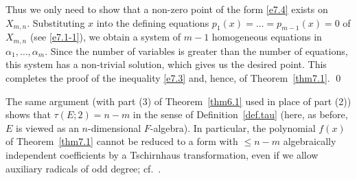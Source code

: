 Thus we only need to show that a non-zero point of the form \eqref{e7.4}
exists on $X_{m, n}$.  Substituting $x$ into the defining equations
$p_1(x) = \ldots = p_{m-1}(x) = 0$ of $X_{m, n}$ (see \eqref{e7.1-1}),
we obtain 
a system of $m-1$ homogeneous equations in $\alpha_1, \ldots, \alpha_m$.
Since the number of variables is greater than the number of equations,
this system has a non-trivial solution, which gives us 
the desired point. This completes the proof of the inequality \eqref{e7.3}
and, hence, of Theorem~\ref{thm7.1}.
\qed

\begin{remark} \label{rem7.3} 
The same argument (with part (3) of Theorem~\ref{thm6.1} used in place of
part (2)) shows that $\tau(E; 2) = n-m$ in the sense of 
Definition~\ref{def.tau} (here, as before, $E$ is viewed as an $n$-dimensional
$F$-algebra).  In particular, the polynomial $f(x)$ of Theorem~\ref{thm7.1}
cannot be reduced to a form with $\leq n-m$ algebraically independent 
coefficients by a Tschirnhaus transformation, even if we allow auxiliary
radicals of odd degree; cf.~\cite[Theorem 7.1]{br2}.
\end{remark}

